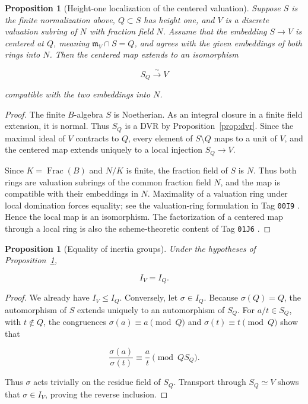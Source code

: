 \documentclass[11pt]{article}
\newtheorem{proposition}[theorem]{Proposition}
\theoremstyle{remark}
\DeclareMathOperator{\Frac}{Frac}
\newcommand{\m}{\mathfrak m}
\begin{document}
\begin{proposition}[Height-one localization of the centered valuation]
\label{prop:valuation-localization}
Suppose \(S\) is the finite normalization above, \(Q\subset S\) has height
one, and \(V\) is a discrete valuation subring of \(N\) with fraction field
\(N\).  Assume that the embedding \(S\to V\) is centered at \(Q\), meaning
\(\m_V\cap S=Q\), and agrees with the given embeddings of both rings into
\(N\).
Then the centered map extends to an isomorphism

\[
  S_Q\xrightarrow{\sim}V
\]

compatible with the two embeddings into \(N\).
\end{proposition}

\begin{proof}
The finite \(B\)-algebra \(S\) is Noetherian.  As an integral closure in a
finite field extension, it is normal.  Thus \(S_Q\) is a DVR by
Proposition~\ref{prop:dvr}.  Since the maximal ideal of \(V\) contracts to
\(Q\), every element of \(S\setminus Q\) maps to a unit of \(V\), and the
centered map extends uniquely to a local injection \(S_Q\to V\).

Since \(K=\Frac(B)\) and \(N/K\) is finite, the fraction field of \(S\) is \(N\).
Thus both rings are valuation subrings of the common fraction field \(N\),
and the map is compatible with their embeddings in \(N\).  Maximality of a
valuation ring under local domination forces equality;
see the valuation-ring formulation in Tag \texttt{00I9}
\cite{StacksValuationRings}.  Hence the local map is an isomorphism.  The
factorization
of a centered map through a local ring is also the scheme-theoretic content
of Tag \texttt{01J6} \cite{StacksLocalRingFactorization}.
\end{proof}

\begin{proposition}[Equality of inertia groups]
\label{prop:inertia-equality}
Under the hypotheses of Proposition~\ref{prop:valuation-localization},

\[
  I_V=I_Q.
\]
\end{proposition}

\begin{proof}
We already have \(I_V\leq I_Q\).  Conversely, let \(\sigma\in I_Q\).
Because \(\sigma(Q)=Q\), the automorphism of \(S\) extends uniquely to an
automorphism of \(S_Q\).  For \(a/t\in S_Q\), with \(t\notin Q\), the
congruences \(\sigma(a)\equiv a\pmod Q\) and
\(\sigma(t)\equiv t\pmod Q\) show that

\[
  \frac{\sigma(a)}{\sigma(t)}
  \equiv\frac{a}{t}\pmod{QS_Q}.
\]

Thus \(\sigma\) acts trivially on the residue field of \(S_Q\).  Transport
through \(S_Q\simeq V\) shows that \(\sigma\in I_V\), proving the reverse
inclusion.
\end{proof}
\end{document}
